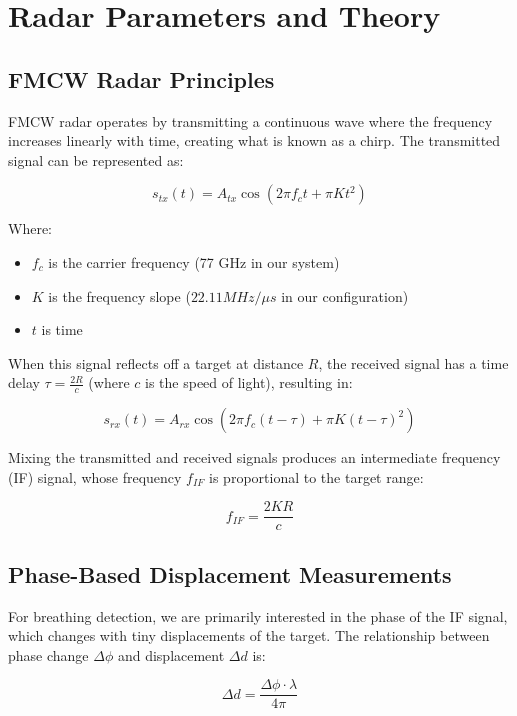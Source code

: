 \documentclass[12pt]{article}
\begin{document}
\section{Radar Parameters and Theory}

\subsection{FMCW Radar Principles}
FMCW radar operates by transmitting a continuous wave where the frequency increases linearly with time, creating what is known as a chirp. The transmitted signal can be represented as:

\begin{equation}
s_{tx}(t) = A_{tx}\cos\left(2\pi f_c t + \pi K t^2\right)
\end{equation}

Where:
\begin{itemize}
    \item $f_c$ is the carrier frequency (77 GHz in our system)
    \item $K$ is the frequency slope ($22.11 MHz/ \mu s$ in our configuration)
    \item $t$ is time
\end{itemize}

When this signal reflects off a target at distance $R$, the received signal has a time delay $\tau = \frac{2R}{c}$ (where $c$ is the speed of light), resulting in:

\begin{equation}
s_{rx}(t) = A_{rx}\cos\left(2\pi f_c (t-\tau) + \pi K (t-\tau)^2\right)
\end{equation}

Mixing the transmitted and received signals produces an intermediate frequency (IF) signal, whose frequency $f_{IF}$ is proportional to the target range:

\begin{equation}
f_{IF} = \frac{2KR}{c}
\end{equation}

\subsection{Phase-Based Displacement Measurements}
For breathing detection, we are primarily interested in the phase of the IF signal, which changes with tiny displacements of the target. The relationship between phase change $\Delta\phi$ and displacement $\Delta d$ is:

\begin{equation}
\Delta d = \frac{\Delta\phi \cdot \lambda}{4\pi}
\end{equation}
\end{document}
